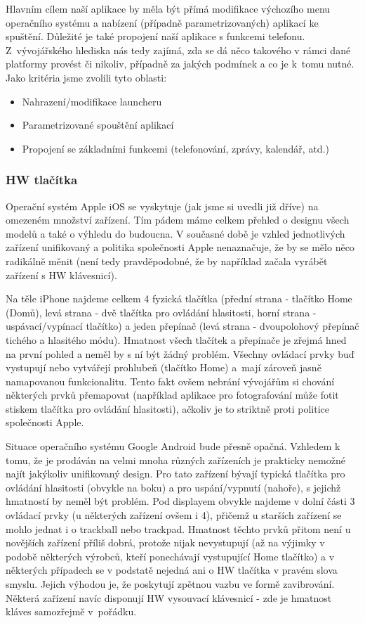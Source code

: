 \documentclass[thesis=M,czech]{FITthesis}[2012/06/26]
\begin{document}
Hlavním cílem naší aplikace by měla být přímá modifikace výchozího menu operačního systému a nabízení (případně parametrizovaných) aplikací ke spuštění. Důležité je také propojení naší aplikace s funkcemi telefonu. Z~vývojářského hlediska nás tedy zajímá, zda se dá něco takového v rámci dané platformy provést či nikoliv, případně za jakých podmínek a co je k~tomu nutné. Jako kritéria jsme zvolili tyto oblasti:

\begin{itemize}
\item    Nahrazení/modifikace launcheru
\item    Parametrizované spouštění aplikací
\item    Propojení se základními funkcemi (telefonování, zprávy, kalendář, atd.)
\end{itemize}

\subsubsection*{HW tlačítka}
Operační systém Apple iOS se vyskytuje (jak jsme si uvedli již dříve) na omezeném množství zařízení. Tím pádem máme celkem přehled o designu všech modelů a také o výhledu do budoucna. V současné době je vzhled jednotlivých zařízení unifikovaný a politika společnosti Apple nenaznačuje, že by se mělo něco radikálně měnit (není tedy pravděpodobné, že by například začala vyrábět zařízení s HW klávesnicí).

Na těle iPhone najdeme celkem 4 fyzická tlačítka (přední strana - tlačítko Home (Domů), levá strana - dvě tlačítka pro ovládání hlasitosti, horní strana - uspávací/vypínací tlačítko) a jeden přepínač (levá strana - dvoupolohový přepínač tichého a hlasitého módu)\cite{iphone}. Hmatnost všech tlačítek a přepínače je zřejmá hned na první pohled a neměl by s ní být žádný problém. Všechny ovládací prvky buď vystupují nebo vytvářejí prohlubeň (tlačítko Home) a~mají zároveň jasně namapovanou funkcionalitu\cite{iphone_anatomy}. Tento fakt ovšem nebrání vývojářům si chování některých prvků přemapovat (například aplikace pro fotografování může fotit stiskem tlačítka pro ovládání hlasitosti), ačkoliv je to striktně proti politice společnosti Apple.

Situace operačního systému Google Android bude přesně opačná. Vzhledem k tomu, že je prodáván na velmi mnoha různých zařízeních je prakticky nemožné najít jakýkoliv unifikovaný design. Pro tato zařízení bývají typická tlačítka pro ovládání hlasitosti (obvykle na boku) a pro uspání/vypnutí (nahoře), s jejichž hmatností by neměl být problém. Pod displayem obvykle najdeme v dolní části 3 ovládací prvky (u některých zařízení ovšem i 4), přičemž u starších zařízení se mohlo jednat i o trackball nebo trackpad. Hmatnost těchto prvků přitom není u novějších zařízení příliš dobrá, protože nijak nevystupují (až na výjimky v podobě některých výrobců, kteří ponechávají vystupující Home tlačítko) a v některých případech se v podstatě nejedná ani o HW tlačítka v pravém slova smyslu. Jejich výhodou je, že poskytují zpětnou vazbu ve formě zavibrování. Některá zařízení navíc disponují HW vysouvací klávesnicí - zde je hmatnost kláves samozřejmě v~pořádku.
\end{document}
